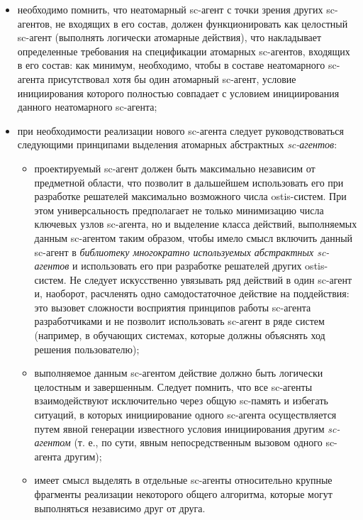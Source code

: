 \begin{itemize}
\item необходимо помнить, что неатомарный sc-агент с точки зрения других sc-агентов, не входящих в его состав, должен функционировать как целостный sc-агент (выполнять логически атомарные действия), что накладывает определенные требования на спецификации атомарных sc-агентов, входящих в его состав: как минимум, необходимо, чтобы в составе неатомарного sc-агента присутствовал хотя бы один атомарный sc-агент, условие инициирования которого полностью совпадает с условием инициирования данного неатомарного sc-агента;
\item при необходимости реализации нового sc-агента следует руководствоваться следующими принципами выделения атомарных абстрактных \textit{sc-агентов}:

\begin{itemize}
    \item проектируемый sc-агент должен быть максимально независим от предметной области, что позволит в дальшейшем использовать его при разработке решателей максимально возможного числа ostis-систем. При этом универсальность предполагает не только минимизацию числа ключевых узлов sc-агента, но и выделение класса действий, выполняемых данным sc-агентом таким образом, чтобы имело смысл включить данный sc-агент в \textit{библиотеку многократно используемых абстрактных sc-агентов} и использовать его при разработке решателей других ostis-систем. Не следует искусственно увязывать ряд действий в один sc-агент и, наоборот, расчленять одно самодостаточное действие на поддействия: это вызовет сложности восприятия принципов работы sc-агента разработчиками и не позволит использовать sc-агент в ряде систем (например, в обучающих системах, которые должны объяснять ход решения пользователю);
    \item выполняемое данным sc-агентом действие должно быть логически целостным и завершенным. Следует помнить, что все sc-агенты взаимодействуют исключительно через общую sc-память и избегать ситуаций, в которых инициирование одного sc-агента осуществляется путем явной генерации известного условия инициирования другим \textit{sc-агентом} (т. е., по сути, явным непосредственным вызовом одного sc-агента другим);
    \item имеет смысл выделять в отдельные sc-агенты относительно крупные фрагменты реализации некоторого общего алгоритма, которые могут выполняться независимо друг от друга.
\end{itemize}


\end{itemize}

